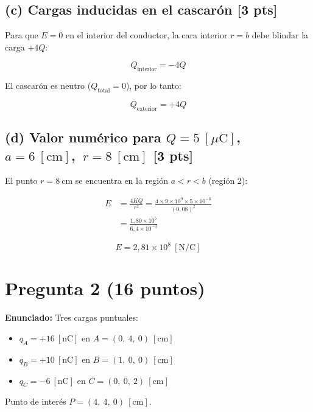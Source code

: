 \documentclass[12pt,letterpaper]{article}
\begin{document}
\subsection*{(c) Cargas inducidas en el cascarón \hfill \normalfont\small[3 pts]}

Para que $E=0$ en el interior del conductor, la cara interior $r=b$ debe blindar la carga $+4Q$:

\[
    \boxed{Q_{\text{interior}} = -4Q}
\]

El cascarón es neutro ($Q_{\text{total}} = 0$), por lo tanto:

\[
    \boxed{Q_{\text{exterior}} = +4Q}
\]

\subsection*{(d) Valor num\'erico para $Q = 5\ [\mu\text{C}]$,\ $a = 6\ [\text{cm}]$,\ $r = 8\ [\text{cm}]$ \hfill \normalfont\small[3 pts]}

El punto $r = 8\ \text{cm}$ se encuentra en la regi\'on $a < r < b$ (regi\'on 2):

\begin{align*}
    E &= \frac{4KQ}{r^{2}}
      = \frac{4\times 9\times10^{9}\times 5\times10^{-6}}{(0{,}08)^{2}}\\[6pt]
      &= \frac{1{,}80\times10^{5}}{6{,}4\times10^{-3}}
\end{align*}

\[
    \boxed{E = 2{,}81\times10^{8}\ [\text{N/C}]}
\]

\newpage

\section*{Pregunta 2 \hfill \normalfont\small(16 puntos)}

\noindent\textbf{Enunciado:} Tres cargas puntuales:
\begin{itemize}
    \item $q_A = +16\ [\text{nC}]$ en $A = (0,\ 4,\ 0)\ [\text{cm}]$
    \item $q_B = +10\ [\text{nC}]$ en $B = (1,\ 0,\ 0)\ [\text{cm}]$
    \item $q_C = -6\ [\text{nC}]$  en $C = (0,\ 0,\ 2)\ [\text{cm}]$
\end{itemize}

Punto de inter\'es $P = (4,\ 4,\ 0)\ [\text{cm}]$.
\end{document}
